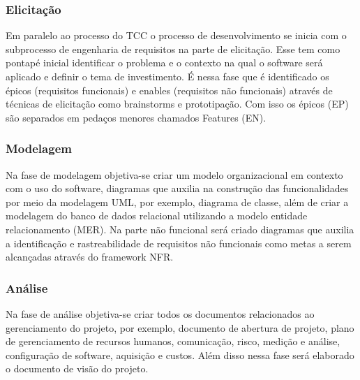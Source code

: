 \subsubsection{Elicitação}

Em paralelo ao processo do TCC o processo de desenvolvimento se inicia com o subprocesso de engenharia de requisitos na parte de elicitação. Esse tem como pontapé inicial identificar o problema e o contexto na qual o software será aplicado e definir o tema de investimento. É nessa fase que é identificado os épicos (requisitos funcionais) e enables (requisitos não funcionais) através de técnicas de elicitação como brainstorms e prototipação. Com isso os épicos (EP) são separados em pedaços menores chamados Features (EN).

\subsubsection{Modelagem}

Na fase de modelagem objetiva-se criar um modelo organizacional em contexto com o uso do software, diagramas que auxilia na construção das funcionalidades por meio da modelagem UML, por exemplo, diagrama de classe, além de criar a modelagem do banco de dados relacional utilizando a modelo entidade relacionamento (MER). Na parte não funcional será criado diagramas que auxilia a identificação e rastreabilidade de requisitos não funcionais como metas a serem alcançadas através do framework NFR.

\subsubsection{Análise}

Na fase de análise objetiva-se criar todos os documentos relacionados ao gerenciamento do projeto, por exemplo, documento de abertura de projeto, plano de gerenciamento de recursos humanos, comunicação, risco, medição e análise, configuração de software, aquisição e custos. Além disso nessa fase será elaborado o documento de visão do projeto.

